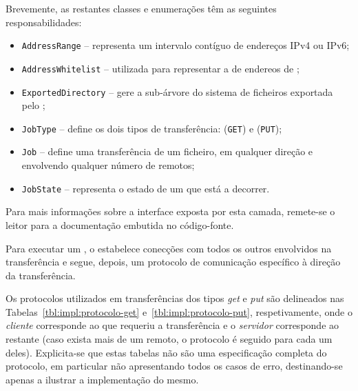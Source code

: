 Brevemente, as restantes classes e enumerações têm as seguintes responsabilidades:

\begin{itemize}
    \item \texttt{AddressRange} -- representa um intervalo contíguo de endereços IPv4 ou IPv6;
    \item \texttt{AddressWhitelist} -- utilizada para representar a  de endereos de ;
    \item \texttt{ExportedDirectory} -- gere a sub-árvore do sistema de ficheiros exportada pelo ;
    \item \texttt{JobType} -- define os dois tipos de transferência:  (\texttt{GET}) e  (\texttt{PUT});
    \item \texttt{Job} -- define uma transferência de um ficheiro, em qualquer direção e envolvendo qualquer número de  remotos;
    \item \texttt{JobState} -- representa o estado de um  que está a decorrer.
\end{itemize}

Para mais informações sobre a interface exposta por esta camada, remete-se o leitor para a documentação  embutida no código-fonte.


Para executar um , o  estabelece conecções com todos os outros  envolvidos na transferência e segue, depois, um protocolo de comunicação específico à direção da transferência.

Os protocolos utilizados em transferências dos tipos \emph{get} e \emph{put} são delineados nas Tabelas~\ref{tbl:impl:protocolo-get} e~\ref{tbl:impl:protocolo-put}, respetivamente, onde o \emph{cliente} corresponde ao  que requeriu a transferência e o \emph{servidor} corresponde ao  restante (caso exista mais de um  remoto, o protocolo é seguido para cada um deles). Explicita-se que estas tabelas não são uma especificação completa do protocolo, em particular não apresentando todos os casos de erro, destinando-se apenas a ilustrar a implementação do mesmo.

